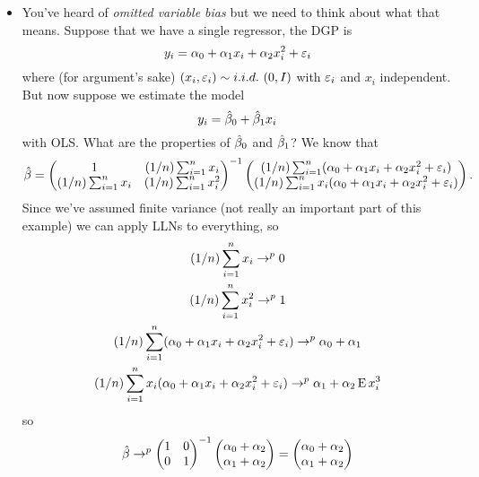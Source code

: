 \begin{itemize}[leftmargin=0pt]

\item You've heard of \emph{omitted variable bias} but we need to
  think about what that means.  Suppose that we have a single
  regressor, the DGP is
  \begin{equation*}
    y_i = \alpha_0 + \alpha_1 x_i + \alpha_2 x^2_i + \varepsilon_i
  \end{equation*}
  where (for argument's sake) $(x_i, \varepsilon_i) \sim i.i.d.\ (0,I)$ with
  $\varepsilon_i$ and $x_i$ independent.  But now suppose we estimate the
  model
  \begin{equation*}
    y_i = \hat{\beta}_0 + \hat{\beta}_1 x_i
  \end{equation*}
  with OLS.  What are the properties of $\hat{\beta}_0$ and $\hat{\beta}_1$?  We know
  that
  \begin{equation*}
    \hat{\beta} =
    \begin{pmatrix}
      1 & (1/n) \sum_{i=1}^n x_i \\
      (1/n) \sum_{i=1}^n x_i & (1/n) \sum_{i=1}^n x^2_i
    \end{pmatrix}^{-1}
    \begin{pmatrix}
      (1/n) \sum_{i=1}^n (\alpha_0 + \alpha_1 x_i + \alpha_2 x_i^2 + \varepsilon_i ) \\
      (1/n) \sum_{i=1}^n x_i (\alpha_0 + \alpha_1 x_i + \alpha_2 x_i^2 + \varepsilon_i)
    \end{pmatrix}.
  \end{equation*}
  Since we've assumed finite variance (not really an important part of
  this example) we can apply LLNs to everything, so
  \begin{gather*}
     (1/n) \sum_{i=1}^n x_i \to^p 0 \\
     (1/n) \sum_{i=1}^n x^2_i \to^p 1 \\
     (1/n) \sum_{i=1}^n (\alpha_0 + \alpha_1 x_i + \alpha_2 x_i^2 + \varepsilon_i ) \to^p  \alpha_0 + \alpha_1 \\
     (1/n) \sum_{i=1}^n x_i (\alpha_0 + \alpha_1 x_i + \alpha_2 x_i^2 + \varepsilon_i) \to^p
     \alpha_1 + \alpha_2 \operatorname{E} x_i^3
  \end{gather*}
  so
  \begin{equation*}
    \hat{\beta} \to^p
    \begin{pmatrix} 1 & 0 \\ 0 & 1 \end{pmatrix}^{-1}
    \begin{pmatrix} \alpha_0 + \alpha_2 \\ \alpha_1 + \alpha_2 \end{pmatrix}
    = \begin{pmatrix} \alpha_0 + \alpha_2 \\ \alpha_1 + \alpha_2 \end{pmatrix}
  \end{equation*}


\end{itemize}
